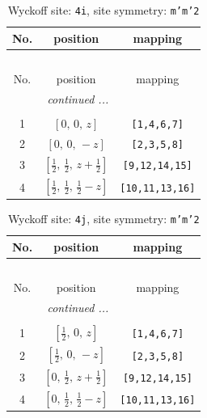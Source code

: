 \documentclass[fleqn,8pt]{jsarticle}
\begin{document}
\renewcommand{\arraystretch}{1.2}
\begin{longtable}{ccc}
\caption{Wyckoff site: {\tt 4i}, site symmetry: {\tt m'm'2}}
 \\
 \hline \hline
No. & position & mapping \\ \hline \endfirsthead

\multicolumn{2}{l}{\tablename\ \thetable{}} \\
 \hline \hline
No. & position & mapping \\ \hline \endhead

 \hline \hline
\multicolumn{2}{r}{\footnotesize\it continued ...} \\ \endfoot

 \hline \hline
\multicolumn{2}{r}{} \\ \endlastfoot

1 & $\left[ 0,\, 0,\, z \right]$ & {\tt [1,4,6,7]} \\ \hline
2 & $\left[ 0,\, 0,\, - z \right]$ & {\tt [2,3,5,8]} \\ \hline
3 & $\left[ \frac{1}{2},\, \frac{1}{2},\, z + \frac{1}{2} \right]$ & {\tt [9,12,14,15]} \\ \hline
4 & $\left[ \frac{1}{2},\, \frac{1}{2},\, \frac{1}{2} - z \right]$ & {\tt [10,11,13,16]} \\
\end{longtable}
\renewcommand{\arraystretch}{1.2}
\begin{longtable}{ccc}
\caption{Wyckoff site: {\tt 4j}, site symmetry: {\tt m'm'2}}
 \\
 \hline \hline
No. & position & mapping \\ \hline \endfirsthead

\multicolumn{2}{l}{\tablename\ \thetable{}} \\
 \hline \hline
No. & position & mapping \\ \hline \endhead

 \hline \hline
\multicolumn{2}{r}{\footnotesize\it continued ...} \\ \endfoot

 \hline \hline
\multicolumn{2}{r}{} \\ \endlastfoot

1 & $\left[ \frac{1}{2},\, 0,\, z \right]$ & {\tt [1,4,6,7]} \\ \hline
2 & $\left[ \frac{1}{2},\, 0,\, - z \right]$ & {\tt [2,3,5,8]} \\ \hline
3 & $\left[ 0,\, \frac{1}{2},\, z + \frac{1}{2} \right]$ & {\tt [9,12,14,15]} \\ \hline
4 & $\left[ 0,\, \frac{1}{2},\, \frac{1}{2} - z \right]$ & {\tt [10,11,13,16]} \\
\end{longtable}
\end{document}
